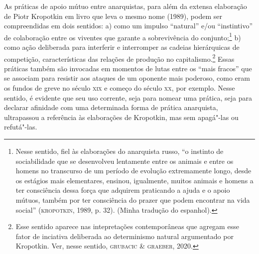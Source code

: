 As práticas de apoio mútuo entre anarquistas, para além da extensa
elaboração de Piotr Kropotkin em livro que leva o mesmo nome (1989),
podem ser compreendidas em dois sentidos: a) como um impulso ``natural''
e/ou ``instintivo'' de colaboração entre os viventes que garante a
sobrevivência do conjunto;\footnote{Nesse sentido, fiel às elaborações
  do anarquista russo, ``o instinto de sociabilidade que se desenvolveu
  lentamente entre os animais e entre os homens no transcurso de um
  período de evolução extremamente longo, desde os estágios mais
  elementares, ensinou, igualmente, muitos animais e homens a ter
  consciência dessa força que adquirem praticando a ajuda e o apoio
  mútuos, também por ter consciência do prazer que podem encontrar na
  vida social'' (\textsc{kropotkin}, 1989, p. 32). (Minha tradução do espanhol).}
b) como ação deliberada para interferir e interromper as cadeias
hierárquicas de competição, características das relações de produção no
capitalismo.\footnote{Esse sentido aparece nas intepretações
  contemporâneas que agregam esse fator de inciativa deliberada ao
  determinismo natural argumentado por Kropotkin. Ver, nesse sentido,
  \textsc{grubacic} \& \textsc{graeber}, 2020.} Essas práticas também são invocadas em
momentos de lutas entre os ``mais fracos'' que se associam para resistir
aos ataques de um oponente mais poderoso, como eram os fundos de greve
no século \textsc{xix} e começo do século \textsc{xx}, por exemplo. Nesse sentido, é
evidente que seu uso corrente, seja para nomear uma prática, seja para
declarar afinidade com uma determinada forma de prática anarquista,
ultrapassou a referência às elaborações de Kropotkin, mas sem apagá"-las
ou refutá"-las.

